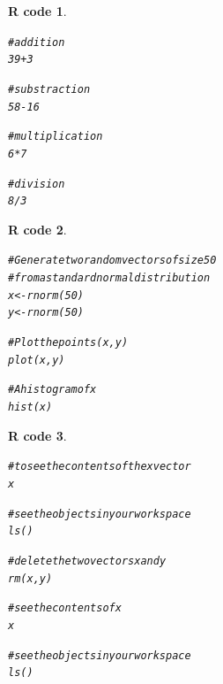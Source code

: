 \documentclass[11pt]{beamer}\usepackage[]{graphicx}\usepackage[]{color}
\makeatletter
\newcommand{\hlnum}[1]{\textcolor[rgb]{0.063,0.58,0.627}{#1}}%
\newcommand{\hlcom}[1]{\textcolor[rgb]{0.588,0.588,0.588}{#1}}%
\newcommand{\hlopt}[1]{\textcolor[rgb]{0.196,0.196,0.196}{#1}}%
\newcommand{\hlstd}[1]{\textcolor[rgb]{0.196,0.196,0.196}{#1}}%
\newcommand{\hlkwb}[1]{\textcolor[rgb]{0.627,0,0.314}{#1}}%
\newcommand{\hlkwd}[1]{\textcolor[rgb]{0.78,0.227,0.412}{#1}}%
\newenvironment{kframe}{%
 \def\at@end@of@kframe{}%
 \ifinner\ifhmode%
  \def\at@end@of@kframe{\end{minipage}}%
  \begin{minipage}{\columnwidth}%
 \fi\fi%
 \def\FrameCommand##1{\hskip\@totalleftmargin \hskip-\fboxsep
 \colorbox{shadecolor}{##1}\hskip-\fboxsep
     \hskip-\linewidth \hskip-\@totalleftmargin \hskip\columnwidth}%
 \MakeFramed {\advance\hsize-\width
   \@totalleftmargin\z@ \linewidth\hsize
   \@setminipage}}%
 {\par\unskip\endMakeFramed%
 \at@end@of@kframe}
\newenvironment{knitrout}{}{} %
\newtheorem{rcode}{R code}[section]
\makeatother
\begin{document}
\begin{frame}
\begin{knitrout}
\color{fgcolor}\begin{kframe}
\begin{rcode}\label{unnamed-chunk-3}\begin{alltt}
\hlcom{# addition}
\hlnum{39} \hlopt{+} \hlnum{3}

\hlcom{# substraction}
\hlnum{58} \hlopt{-} \hlnum{16}

\hlcom{# multiplication}
\hlnum{6} \hlopt{*} \hlnum{7}

\hlcom{# division}
\hlnum{8} \hlopt{/} \hlnum{3}
\end{alltt}
\end{rcode}\end{kframe}
\end{knitrout}
\end{frame}



\begin{frame}
\begin{knitrout}
\color{fgcolor}\begin{kframe}
\begin{rcode}\label{unnamed-chunk-4}\begin{alltt}
\hlcom{# Generate two random vectors of size 50 }
\hlcom{# from a standard normal distribution}
\hlstd{x} \hlkwb{<-} \hlkwd{rnorm}\hlstd{(}\hlnum{50}\hlstd{)}
\hlstd{y} \hlkwb{<-} \hlkwd{rnorm}\hlstd{(}\hlnum{50}\hlstd{)}

\hlcom{# Plot the points (x, y)}
\hlkwd{plot}\hlstd{(x, y)}

\hlcom{# A histogram of x}
\hlkwd{hist}\hlstd{(x)}
\end{alltt}
\end{rcode}\end{kframe}
\end{knitrout}
\end{frame}


\begin{frame}
\begin{knitrout}
\color{fgcolor}\begin{kframe}
\begin{rcode}\label{unnamed-chunk-5}\begin{alltt}
\hlcom{# to see the contents of the x vector}
\hlstd{x}

\hlcom{# see the objects in your workspace}
\hlkwd{ls}\hlstd{()}

\hlcom{# delete the two vectors x and y}
\hlkwd{rm}\hlstd{(x,y)}

\hlcom{# see the contents of x}
\hlstd{x}

\hlcom{# see the objects in your workspace}
\hlkwd{ls}\hlstd{()}
\end{alltt}
\end{rcode}\end{kframe}
\end{knitrout}
\end{frame}
\end{document}
